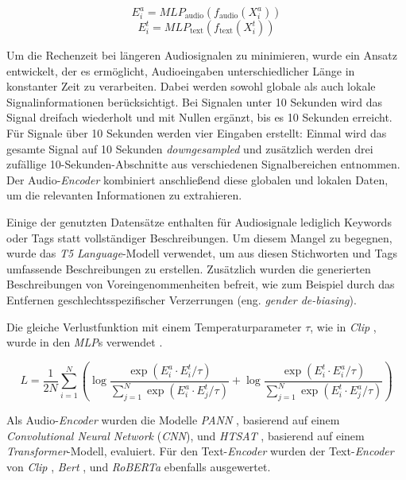 \documentclass[
  a4paper,  %
  twoside,  %
  bibliography=totoc,
  headsepline,
  cleardoublepage=empty,
  parskip=half,
  draft=false
]{scrbook}
\begin{document}
\begin{equation}
     E_i^a = M L P_{\text{audio}}\left(f_{\text{audio}}\left(X_i^a\right)\right)
\end{equation}
\begin{equation}
    E_i^t = M L P_{\text{text}}\left(f_{\text{text}}\left(X_i^t\right)\right)
\end{equation}

Um die Rechenzeit bei längeren Audiosignalen zu minimieren, wurde ein Ansatz entwickelt, der es ermöglicht, Audioeingaben unterschiedlicher Länge in konstanter Zeit zu verarbeiten. Dabei werden sowohl globale als auch lokale Signalinformationen berücksichtigt. Bei Signalen unter 10 Sekunden wird das Signal dreifach wiederholt und mit Nullen ergänzt, bis es 10 Sekunden erreicht. Für Signale über 10 Sekunden werden vier Eingaben erstellt: Einmal wird das gesamte Signal auf 10 Sekunden \emph{downgesampled} und zusätzlich werden drei zufällige 10-Sekunden-Abschnitte aus verschiedenen Signalbereichen entnommen. Der Audio-\emph{Encoder} kombiniert anschließend diese globalen und lokalen Daten, um die relevanten Informationen zu extrahieren. \cite{wu_large-scale_2023}

Einige der genutzten Datensätze enthalten für Audiosignale lediglich Keywords oder Tags statt vollständiger Beschreibungen. Um diesem Mangel zu begegnen, wurde das \emph{T5} \cite{raffel_exploring_2020} \emph{Language}-Modell verwendet, um aus diesen Stichworten und Tags umfassende Beschreibungen zu erstellen. Zusätzlich wurden die generierten Beschreibungen von Voreingenommenheiten befreit, wie zum Beispiel durch das Entfernen geschlechtsspezifischer Verzerrungen (eng. \emph{gender de-biasing}). \cite{wu_large-scale_2023}

Die gleiche Verlustfunktion mit einem Temperaturparameter $\tau$, wie in \emph{Clip} \cite{radford_learning_2021}, wurde in den \emph{MLP}s verwendet \cite{wu_large-scale_2023}.

\begin{equation}
L=\frac{1}{2 N} \sum_{i=1}^N\left(\log \frac{\exp \left(E_i^a \cdot E_i^t / \tau\right)}{\sum_{j=1}^N \exp \left(E_i^a \cdot E_j^t / \tau\right)}+\log \frac{\exp \left(E_i^t \cdot E_i^a / \tau\right)}{\sum_{j=1}^N \exp \left(E_i^t \cdot E_j^a / \tau\right)}\right)
\end{equation}

Als Audio-\emph{Encoder} wurden die Modelle \emph{PANN} \cite{kong_panns_2020}, basierend auf einem \emph{Convolutional Neural Network} (\emph{CNN}), und \emph{HTSAT} \cite{chen_hts-at_2022}, basierend auf einem \emph{Transformer}-Modell, evaluiert. Für den Text-\emph{Encoder} wurden der Text-\emph{Encoder} von \emph{Clip} \cite{radford_learning_2021}, \emph{Bert} \cite{devlin_bert_2019}, und \emph{RoBERTa} \cite{liu_roberta_2019} ebenfalls ausgewertet. \cite{wu_large-scale_2023}
\end{document}
